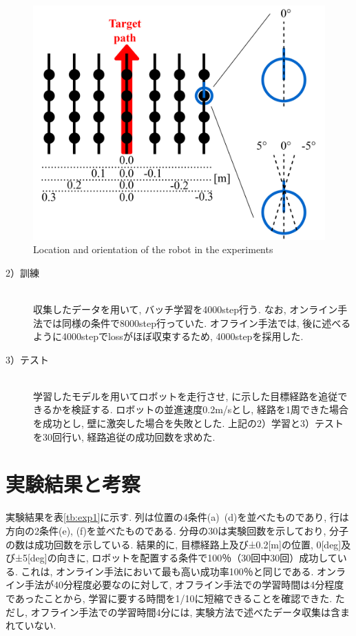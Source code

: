 \begin{figure}[h]
  \centering
  \includegraphics[keepaspectratio, scale=0.6]{images/collect2.png}
  \caption{Location and orientation of the robot in the experiments}
  \label{Fig:old-method}
  \end{figure}

\begin{description}
  \item[2）訓練]\mbox{}\\ \hspace*{3mm}収集したデータを用いて, バッチ学習を4000step行う. なお, オンライン手法では同様の条件で8000step行っていた. オフライン手法では, 後に述べるように4000stepでlossがほぼ収束するため, 4000stepを採用した.
\end{description}

\begin{description}
  \item[3）テスト]\mbox{}\\ \hspace*{3mm}学習したモデルを用いてロボットを走行させ, に示した目標経路を追従できるかを検証する. ロボットの並進速度0.2m/sとし, 経路を1周できた場合を成功とし, 壁に激突した場合を失敗とした. 上記の2）学習と3）テストを30回行い, 経路追従の成功回数を求めた. 
\end{description}

\section{実験結果と考察}
実験結果を表\ref{tb:exp1}に示す. 列は位置の4条件(a)~(d)を並べたものであり, 行は方向の2条件(e), (f)を並べたものである. 分母の30は実験回数を示しており, 分子の数は成功回数を示している. 結果的に, 目標経路上及び±0.2[m]の位置, 0[deg]及び±5[deg]の向きに, ロボットを配置する条件で100％（30回中30回）成功している. これは, オンライン手法において最も高い成功率100％\cite{okada-si2021}と同じである. オンライン手法が40分程度必要なのに対して, オフライン手法での学習時間は4分程度であったことから, 学習に要する時間を1/10に短縮できることを確認できた. ただし, オフライン手法での学習時間4分には, 実験方法で述べたデータ収集は含まれていない. 

